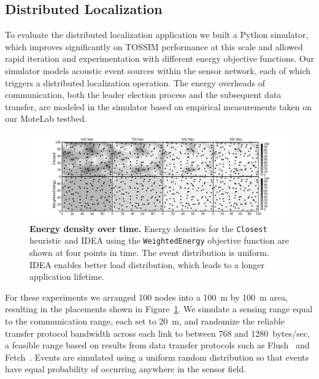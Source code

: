 \subsection{Distributed Localization}

To evaluate the distributed localization application we built a Python
simulator, which improves significantly on TOSSIM performance at this scale
and allowed rapid iteration and experimentation with different energy
objective functions. Our simulator models acoustic event sources within the
sensor network, each of which triggers a distributed localization operation.
The energy overheads of communication, both the leader election process and
the subsequent data transfer, are modeled in the simulator based on empirical
measurements taken on our MoteLab testbed.

\begin{figure}[t]
\begin{center}
\includegraphics[width=\hsize]{./figs/graph_density_vs_time0406_2151.png}
\end{center}
\caption{\small{\textbf{Energy density over time.}
Energy densities for the \texttt{Closest} heuristic and IDEA using the
\texttt{WeightedEnergy} objective function are shown at four points in time. The
event distribution is uniform. IDEA enables better load distribution, which
leads to a longer application lifetime.}}
\label{fig-localizationdensityvtime}
\end{figure}

For these experiments we arranged 100 nodes into a 100~m by 100~m area,
resulting in the placements shown in
Figure~\ref{fig-localizationdensityvtime}. We simulate a sensing range equal
to the communication range, each set to 20~m, and randomize the reliable
transfer protocol bandwidth across each link to between 768 and
1280~bytes/sec, a feasible range based on results from data transfer
protocols such as Flush~\cite{flush-sensys07} and
Fetch~\cite{volcano-osdi06}.  Events are simulated using a uniform random
distribution so that events have equal probability of occurring anywhere in
the sensor field.

